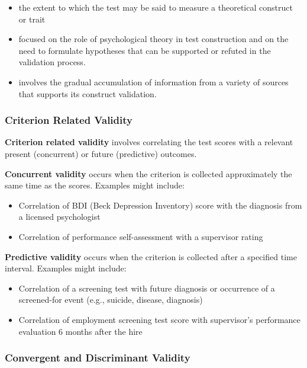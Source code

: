 \documentclass[
  english,
]{book}
\providecommand{\tightlist}{%
  \setlength{\itemsep}{0pt}\setlength{\parskip}{0pt}}
\begin{document}
\begin{itemize}
\tightlist
\item
  the extent to which the test may be said to measure a theoretical construct or trait
\item
  focused on the role of psychological theory in test construction and on the need to formulate hypotheses that can be supported or refuted in the validation process.
\item
  involves the gradual accumulation of information from a variety of sources that supports its construct validation.
\end{itemize}

\hypertarget{criterion-related-validity}{%
\subsubsection{Criterion Related Validity}\label{criterion-related-validity}}

\textbf{Criterion related validity} involves correlating the test scores with a relevant present (concurrent) or future (predictive) outcomes.

\textbf{Concurrent validity} occurs when the criterion is collected approximately the same time as the scores. Examples might include:

\begin{itemize}
\tightlist
\item
  Correlation of BDI (Beck Depression Inventory) score with the diagnosis from a licensed psychologist
\item
  Correlation of performance self-assessment with a supervisor rating
\end{itemize}

\textbf{Predictive validity} occurs when the criterion is collected after a specified time interval. Examples might include:

\begin{itemize}
\tightlist
\item
  Correlation of a screening test with future diagnosis or occurrence of a screened-for event (e.g., suicide, disease, diagnosis)
\item
  Correlation of employment screening test score with supervisor's performance evaluation 6 months after the hire
\end{itemize}

\hypertarget{convergent-and-discriminant-validity}{%
\subsubsection{Convergent and Discriminant Validity}\label{convergent-and-discriminant-validity}}
\end{document}
